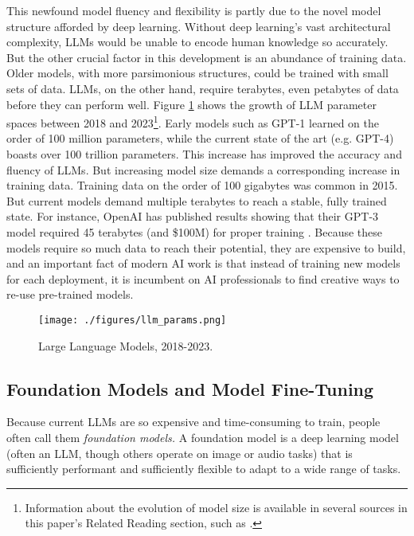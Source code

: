 \documentclass[12pt, oneside]{article}   	%
\begin{document}
This newfound model fluency and flexibility is partly due to the novel model structure afforded by deep learning.  Without deep learning’s vast architectural complexity, LLMs would be unable to encode human knowledge so accurately.  But the other crucial factor in this development is an abundance of training data.  Older models, with more parsimonious structures, could be trained with small sets of data.  LLMs, on the other hand, require terabytes, even petabytes of data before they can perform well.  Figure \ref{figure.llm_size} shows the growth of LLM parameter spaces between 2018 and 2023\footnote{Information about the evolution of model size is available in several sources in this paper’s Related Reading section, such as \cite{shazeer:2017, wei:2022}.}.  Early models such as GPT-1 learned on the order of 100 million parameters, while the current state of the art (e.g. GPT-4) boasts over 100 trillion parameters.  This increase has improved the accuracy and fluency of LLMs.  But increasing model size demands a corresponding increase in training data.  Training data on the order of 100 gigabytes was common in 2015.  But current models demand multiple terabytes to reach a stable, fully trained state.  For instance, OpenAI has published results showing that their GPT-3 model required 45 terabytes (and \$100M) for proper training \cite{brown:2020}. Because these models require so much data to reach their potential, they are expensive to build, and an important fact of modern AI work is that instead of training new models for each deployment, it is incumbent on AI professionals to find creative ways to re-use pre-trained models.


\begin{figure}[htbp]
\begin{center}
\texttt{[image: ./figures/llm\_params.png]}
\caption{Large Language Models, 2018-2023.}
\label{figure.llm_size}
\end{center}
\end{figure}


\subsection{Foundation Models and Model Fine-Tuning}\label{section.definitions.foundation-models}

Because current LLMs are so expensive and time-consuming to train, people often call them \emph{foundation models.}  A foundation model is a deep learning model (often an LLM, though others operate on image or audio tasks) that is sufficiently performant and sufficiently flexible to adapt to a wide range of tasks.  
\end{document}
